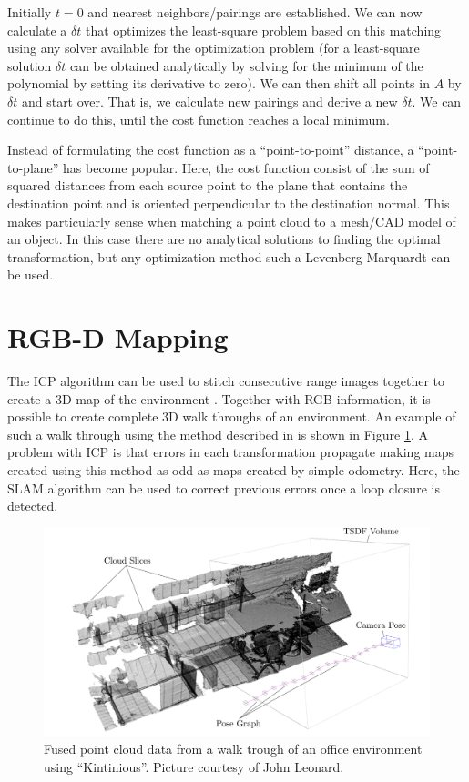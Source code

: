 \documentclass[paper=6.14in:9.21in,pagesize=pdftex,11pt,twoside,openright]{scrbook}
\begin{document}
Initially $t=0$ and nearest neighbors/pairings are established. We can now calculate a $ \delta t$ that optimizes the least-square problem based on this matching using any solver available for the optimization problem (for a least-square solution $ \delta t$ can be obtained analytically by solving for the minimum of the polynomial by setting its derivative to zero). We can then shift all points in $ A$ by $ \delta t$ and start over. That is, we calculate new pairings and derive a new $ \delta t$.  We can continue to do this, until the cost function reaches a local minimum.

Instead of formulating the cost function as a ``point-to-point'' distance, a ``point-to-plane'' has become popular. Here, the cost function consist of the sum of squared distances from each source point to the plane that contains the destination point and is oriented perpendicular to the destination normal. This makes particularly sense when matching a point cloud to a mesh/CAD model of an object. In this case there are no analytical solutions to finding the optimal transformation, but any optimization method such a Levenberg-Marquardt can be used.

\section{RGB-D Mapping}
The ICP algorithm can be used to stitch consecutive range images together to create a 3D map of the environment \cite{henry2010rgb}. Together with RGB information, it is possible to create complete 3D walk throughs of an environment. An example of such a walk through using the method described in \cite{whelan2013robust} is shown in Figure \ref{fig:kintinous}.
A problem with ICP is that errors in each transformation propagate making maps created using this method as odd as maps created by simple odometry. Here, the SLAM algorithm can be used to correct previous errors once a loop closure is detected.


\begin{figure}
\centering
\includegraphics[width=\textwidth]{figs/kintinous}
\caption{Fused point cloud data from a walk trough of an office environment using ``Kintinious''. Picture courtesy of John Leonard.\label{fig:kintinous}}
\end{figure}
\end{document}
